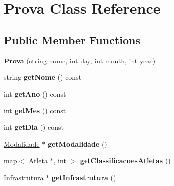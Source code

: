 \hypertarget{class_prova}{}\section{Prova Class Reference}
\label{class_prova}
\subsection*{Public Member Functions}
\begin{DoxyCompactItemize}
\item 
\hypertarget{class_prova_acb142e2a5d1208413d18b2a82a0b091b}{}{\bfseries Prova} (string name, int day, int month, int year)\label{class_prova_acb142e2a5d1208413d18b2a82a0b091b}

\item 
\hypertarget{class_prova_a36e205bd3a124c2ec00f0391ecb7fdfd}{}string {\bfseries get\+Nome} () const \label{class_prova_a36e205bd3a124c2ec00f0391ecb7fdfd}

\item 
\hypertarget{class_prova_a320a56d0682344bfc42d3522222e04d6}{}int {\bfseries get\+Ano} () const \label{class_prova_a320a56d0682344bfc42d3522222e04d6}

\item 
\hypertarget{class_prova_af73d2143f0a524458e4bea47144051ea}{}int {\bfseries get\+Mes} () const \label{class_prova_af73d2143f0a524458e4bea47144051ea}

\item 
\hypertarget{class_prova_a4937a86197edcd21ab27f24bb19bf5e6}{}int {\bfseries get\+Dia} () const \label{class_prova_a4937a86197edcd21ab27f24bb19bf5e6}

\item 
\hypertarget{class_prova_aaa98c4af9413dcbef62b746211392319}{}\hyperlink{class_modalidade}{Modalidade} $\ast$ {\bfseries get\+Modalidade} ()\label{class_prova_aaa98c4af9413dcbef62b746211392319}

\item 
\hypertarget{class_prova_a7c2ceb8e87016ffc1664ff2d6bf9fdfc}{}map$<$ \hyperlink{class_atleta}{Atleta} $\ast$, int $>$ {\bfseries get\+Classificacoes\+Atletas} ()\label{class_prova_a7c2ceb8e87016ffc1664ff2d6bf9fdfc}

\item 
\hypertarget{class_prova_ade85a788f4ad45311315e1f7d59b74bd}{}\hyperlink{class_infrastrutura}{Infrastrutura} $\ast$ {\bfseries get\+Infrastrutura} ()\label{class_prova_ade85a788f4ad45311315e1f7d59b74bd}


\end{DoxyCompactItemize}
